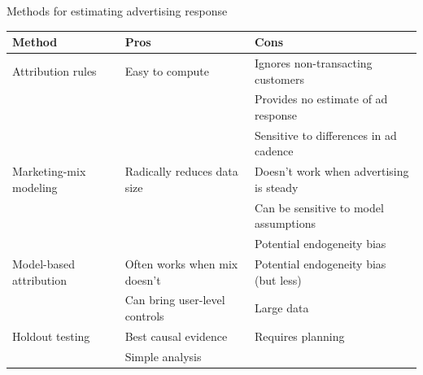 \documentclass[10pt, aspectratio=169]{beamer}
\begin{document}
\begin{frame}{Methods for estimating advertising response}
\footnotesize
\begin{tabular}{l l l}
Method & Pros & Cons \\
\hline
Attribution rules & Easy to compute & Ignores non-transacting customers \\
& & Provides no estimate of ad response \\
& & Sensitive to differences in ad cadence \\
\hline
Marketing-mix modeling & Radically reduces data size & Doesn't work when advertising is steady\\
& & Can be sensitive to model assumptions\\
& & Potential endogeneity bias \\
\hline
Model-based attribution & Often works when mix doesn't & Potential endogeneity bias (but less) \\
& Can bring user-level controls & Large data  \\
\hline 
Holdout testing & Best causal evidence & Requires planning \\
& Simple analysis & \\
\end{tabular}
\end{frame}
\end{document}
